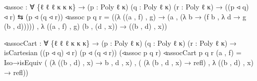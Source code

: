 \documentclass[
  11pt,
  oneside,
  article]{memoir}
\newenvironment{Shaded}{}{}
\newcommand{\NormalTok}[1]{#1}
\newcommand{\OtherTok}[1]{\textcolor[rgb]{0.00,0.44,0.13}{#1}}
\theoremstyle{definition}
\theoremstyle{plain}
\newcommand{\0}{\textsf{0}}
\newcommand{\1}{\tn{\textsf{1}}}
\begin{document}
\begin{Shaded}
\begin{Highlighting}[]
\NormalTok{◃assoc }\OtherTok{:} \OtherTok{∀} \OtherTok{\{}\NormalTok{ℓ ℓ\textquotesingle{} ℓ\textquotesingle{}\textquotesingle{} κ κ\textquotesingle{} κ\textquotesingle{}\textquotesingle{}}\OtherTok{\}}
         \OtherTok{→} \OtherTok{(}\NormalTok{p }\OtherTok{:}\NormalTok{ Poly ℓ κ}\OtherTok{)} \OtherTok{(}\NormalTok{q }\OtherTok{:}\NormalTok{ Poly ℓ\textquotesingle{} κ\textquotesingle{}}\OtherTok{)} \OtherTok{(}\NormalTok{r }\OtherTok{:}\NormalTok{ Poly ℓ\textquotesingle{}\textquotesingle{} κ\textquotesingle{}\textquotesingle{}}\OtherTok{)}
         \OtherTok{→} \OtherTok{((}\NormalTok{p ◃ q}\OtherTok{)}\NormalTok{ ◃ r}\OtherTok{)}\NormalTok{ ⇆ }\OtherTok{(}\NormalTok{p ◃ }\OtherTok{(}\NormalTok{q ◃ r}\OtherTok{))}
\NormalTok{◃assoc p q r }\OtherTok{=} 
    \OtherTok{((λ} \OtherTok{((}\NormalTok{a , f}\OtherTok{)}\NormalTok{ , g}\OtherTok{)} \OtherTok{→} \OtherTok{(}\NormalTok{a , }\OtherTok{(λ}\NormalTok{ b }\OtherTok{→} \OtherTok{(}\NormalTok{f b , }\OtherTok{λ}\NormalTok{ d }\OtherTok{→}\NormalTok{ g }\OtherTok{(}\NormalTok{b , d}\OtherTok{)))))} 
\NormalTok{    , }\OtherTok{λ} \OtherTok{((}\NormalTok{a , f}\OtherTok{)}\NormalTok{ , g}\OtherTok{)} \OtherTok{(}\NormalTok{b , }\OtherTok{(}\NormalTok{d , x}\OtherTok{))} \OtherTok{→} \OtherTok{((}\NormalTok{b , d}\OtherTok{)}\NormalTok{ , x}\OtherTok{))}

\NormalTok{◃assocCart }\OtherTok{:} \OtherTok{∀} \OtherTok{\{}\NormalTok{ℓ ℓ\textquotesingle{} ℓ\textquotesingle{}\textquotesingle{} κ κ\textquotesingle{} κ\textquotesingle{}\textquotesingle{}}\OtherTok{\}}
             \OtherTok{→} \OtherTok{(}\NormalTok{p }\OtherTok{:}\NormalTok{ Poly ℓ κ}\OtherTok{)} \OtherTok{(}\NormalTok{q }\OtherTok{:}\NormalTok{ Poly ℓ\textquotesingle{} κ\textquotesingle{}}\OtherTok{)} \OtherTok{(}\NormalTok{r }\OtherTok{:}\NormalTok{ Poly ℓ\textquotesingle{}\textquotesingle{} κ\textquotesingle{}\textquotesingle{}}\OtherTok{)}
             \OtherTok{→}\NormalTok{ isCartesian }\OtherTok{((}\NormalTok{p ◃ q}\OtherTok{)}\NormalTok{ ◃ r}\OtherTok{)} \OtherTok{(}\NormalTok{p ◃ }\OtherTok{(}\NormalTok{q ◃ r}\OtherTok{))} \OtherTok{(}\NormalTok{◃assoc p q r}\OtherTok{)}
\NormalTok{◃assocCart p q r }\OtherTok{(}\NormalTok{a , f}\OtherTok{)} \OtherTok{=} 
\NormalTok{    Iso→isEquiv }\OtherTok{(} \OtherTok{(λ} \OtherTok{((}\NormalTok{b , d}\OtherTok{)}\NormalTok{ , x}\OtherTok{)} \OtherTok{→}\NormalTok{ b , d , x}\OtherTok{)}
\NormalTok{                , }\OtherTok{(} \OtherTok{(λ} \OtherTok{(}\NormalTok{b , d , x}\OtherTok{)} \OtherTok{→}\NormalTok{ refl}\OtherTok{)} 
\NormalTok{                  , }\OtherTok{λ} \OtherTok{((}\NormalTok{b , d}\OtherTok{)}\NormalTok{ , x}\OtherTok{)} \OtherTok{→}\NormalTok{ refl}\OtherTok{))}
\end{Highlighting}
\end{Shaded}
\end{document}
